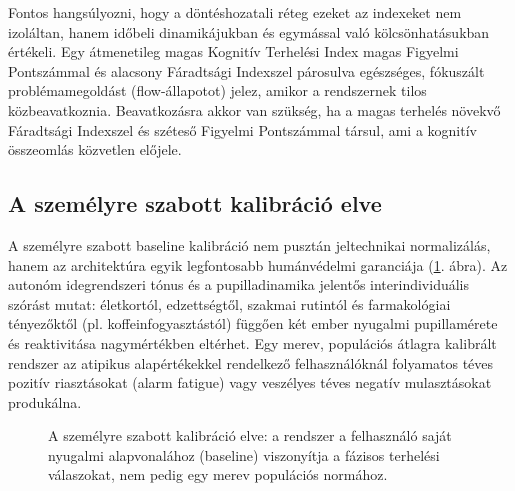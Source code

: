 \documentclass[12pt,a4paper,oneside]{book}
\begin{document}
Fontos hangsúlyozni, hogy a döntéshozatali réteg ezeket az indexeket nem izoláltan, hanem időbeli dinamikájukban és egymással való kölcsönhatásukban értékeli. Egy átmenetileg magas Kognitív Terhelési Index magas Figyelmi Pontszámmal és alacsony Fáradtsági Indexszel párosulva egészséges, fókuszált problémamegoldást (flow-állapotot) jelez, amikor a rendszernek tilos közbeavatkoznia. Beavatkozásra akkor van szükség, ha a magas terhelés növekvő Fáradtsági Indexszel és széteső Figyelmi Pontszámmal társul, ami a kognitív összeomlás közvetlen előjele.

\subsection{A személyre szabott kalibráció elve}

A személyre szabott baseline kalibráció nem pusztán jeltechnikai normalizálás, hanem az architektúra egyik legfontosabb humánvédelmi garanciája (\ref{fig:calibration}. ábra). Az autonóm idegrendszeri tónus és a pupilladinamika jelentős interindividuális szórást mutat: életkortól, edzettségtől, szakmai rutintól és farmakológiai tényezőktől (pl. koffeinfogyasztástól) függően két ember nyugalmi pupillamérete és reaktivitása nagymértékben eltérhet. Egy merev, populációs átlagra kalibrált rendszer az atipikus alapértékekkel rendelkező felhasználóknál folyamatos téves pozitív riasztásokat (alarm fatigue) vagy veszélyes téves negatív mulasztásokat produkálna.

\begin{figure}[H]
    \centering
    \caption{A személyre szabott kalibráció elve: a rendszer a felhasználó saját nyugalmi alapvonalához (baseline) viszonyítja a fázisos terhelési válaszokat, nem pedig egy merev populációs normához.}
    \label{fig:calibration}
\end{figure}
\end{document}

